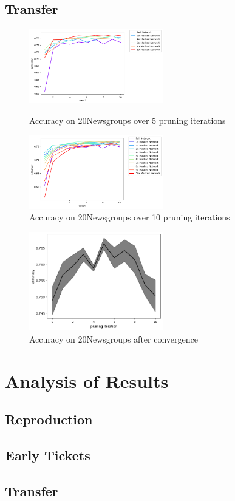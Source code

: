 \subsection*{Transfer}
\begin{figure}
	\begin{minipage}{0.5\textwidth}
		\centering
		\includegraphics[width=220px]{gfx/Experiments/Transfer-20Newsgroups-CNN/accuracy/5_iterations.png}
		\caption*{Accuracy on 20Newsgroups over 5 pruning iterations}
		\label{fig:CIFAR10accuracy10}
	\end{minipage}\hfill
	\begin{minipage}{0.5\textwidth}
		\centering
		\includegraphics[width=220px]{gfx/Experiments/Transfer-20Newsgroups-CNN/accuracy/10_iterations.png}
		\caption*{Accuracy on 20Newsgroups over 10 pruning iterations}
		\label{fig:CIFAR10accuracy15}
	\end{minipage}
\end{figure}
\begin{figure}
	\begin{minipage}{0.5\textwidth}
		\centering
		\includegraphics[width=220px]{gfx/Experiments/Transfer-20Newsgroups-CNN/accuracy/converged.png}
		\caption*{Accuracy on 20Newsgroups after convergence}
		\label{?}
	\end{minipage}\hfill
	\begin{minipage}{0.5\textwidth}
		\centering
	\end{minipage}
\end{figure}

\section{Analysis of Results}
\subsection*{Reproduction}
\subsection*{Early Tickets}
\subsection*{Transfer}
